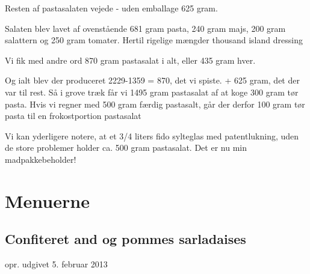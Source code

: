 \documentclass[
  letterpaper,
  DIV=11,
  numbers=noendperiod]{scrreprt}
\begin{document}
Resten af pastasalaten vejede - uden emballage 625 gram.

Salaten blev lavet af ovenstående 681 gram pasta, 240 gram majs, 200
gram salattern og 250 gram tomater. Hertil rigelige mængder thousand
island dressing

Vi fik med andre ord 870 gram pastasalat i alt, eller 435 gram hver.

Og ialt blev der produceret 2229-1359 = 870, det vi spiste. + 625 gram,
det der var til rest. Så i grove træk får vi 1495 gram pastasalat af at
koge 300 gram tør pasta. Hvis vi regner med 500 gram færdig pastasalt,
går der derfor 100 gram tør pasta til en frokostportion pastasalat

Vi kan yderligere notere, at et 3/4 liters fido sylteglas med
patentlukning, uden de store problemer holder ca. 500 gram pastasalat.
Det er nu min madpakkebeholder!


\hypertarget{menuerne}{%
\chapter{Menuerne}\label{menuerne}}

\hypertarget{confiteret-and-og-pommes-sarladaises}{%
\section{Confiteret and og pommes
sarladaises}\label{confiteret-and-og-pommes-sarladaises}}

opr. udgivet 5. februar 2013
\end{document}
